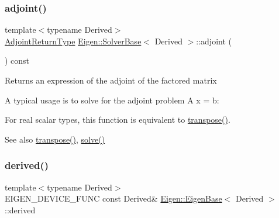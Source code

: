 \subsubsection{\texorpdfstring{adjoint()}{adjoint()}}
{\footnotesize\ttfamily template$<$typename Derived$>$ \\
\mbox{\hyperlink{struct_eigen_1_1internal_1_1true__type}{Adjoint\+Return\+Type}} \mbox{\hyperlink{class_eigen_1_1_solver_base}{Eigen\+::\+Solver\+Base}}$<$ Derived $>$\+::adjoint (\begin{DoxyParamCaption}{ }\end{DoxyParamCaption}) const\hspace{0.3cm}{\ttfamily [inline]}}

\begin{DoxyReturn}{Returns}
an expression of the adjoint of the factored matrix
\end{DoxyReturn}
A typical usage is to solve for the adjoint problem A\textquotesingle{} x = b\+: 
\begin{DoxyCode}{0}
\end{DoxyCode}


For real scalar types, this function is equivalent to \mbox{\hyperlink{class_eigen_1_1_solver_base_a732e75b5132bb4db3775916927b0e86c}{transpose()}}.

\begin{DoxySeeAlso}{See also}
\mbox{\hyperlink{class_eigen_1_1_solver_base_a732e75b5132bb4db3775916927b0e86c}{transpose()}}, \mbox{\hyperlink{class_eigen_1_1_solver_base_a7fd647d110487799205df6f99547879d}{solve()}} 
\end{DoxySeeAlso}
\mbox{\label{class_eigen_1_1_solver_base_ad0cbee5e2dfef3bbe9db5e6d5fe12cc0}} 
\subsubsection{\texorpdfstring{derived()}{derived()}\hspace{0.1cm}{\footnotesize\ttfamily [1/2]}}
{\footnotesize\ttfamily template$<$typename Derived$>$ \\
E\+I\+G\+E\+N\+\_\+\+D\+E\+V\+I\+C\+E\+\_\+\+F\+U\+NC const Derived\& \mbox{\hyperlink{struct_eigen_1_1_eigen_base}{Eigen\+::\+Eigen\+Base}}$<$ Derived $>$\+::derived\hspace{0.3cm}{\ttfamily [inline]}}

